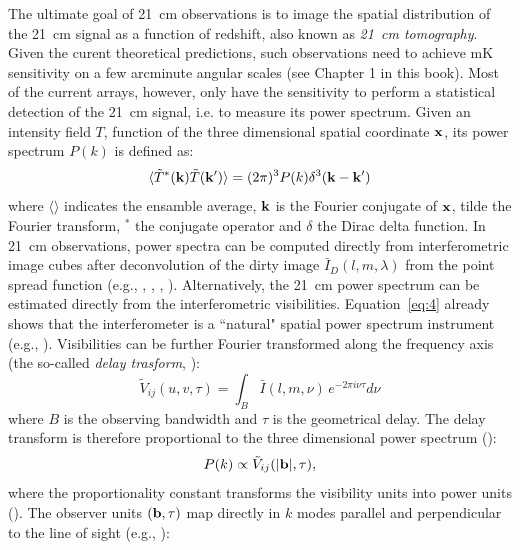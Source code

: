 The ultimate goal of 21~cm observations is to image the spatial distribution of the 21~cm signal as a function of redshift, also known as {\it 21~cm tomography}. Given the curent theoretical predictions, such observations need to achieve mK sensitivity on a few arcminute angular scales (see Chapter 1 in this book). Most of the current arrays, however, only have the sensitivity to perform a statistical detection of the 21~cm signal, i.e. to measure its power spectrum. Given an intensity field $T$, function of the three dimensional spatial coordinate $\bf x$, its power spectrum $P(k)$ is defined as:
\begin{equation}
\langle {\tilde T}^* ({\bf k}) {\tilde T}({\bf k'}) \rangle = (2 \pi)^3 P(k) \delta^3({\bf k} - {\bf k}')
\label{sec_observables_eq1}
\end{equation}
where $\langle \rangle$ indicates the ensamble average, $\bf k$ is the Fourier conjugate of $\bf x$, tilde the Fourier transform, $^*$ the conjugate operator and $\delta$ the Dirac delta function. In 21~cm observations, power spectra can be computed directly from interferometric image cubes after deconvolution of the dirty image ${\bar I}_D (l,m,\lambda)$ from the point spread function (e.g., \cite{pen09}, \cite{harker10}, \cite{beardsley16}, \cite{patil17}). Alternatively, the 21~cm power spectrum can be estimated directly from the interferometric visibilities. Equation~\ref{eq:4} already shows that the interferometer is a ``natural" spatial power spectrum instrument (e.g., \cite{white99}). Visibilities can be further Fourier transformed along the frequency axis (the so-called {\it delay trasform}, \cite{parsons12a}): 
\begin{equation}
{\tilde V}_{ij} (u,v, \tau) = \int_B {\bar I} (l, m, \nu) \, e^{-2 \pi i \nu \tau} d \nu
\label{sec_observables_eq2}
\end{equation}
where $B$ is the observing bandwidth and $\tau$ is the geometrical delay. The delay transform is therefore proportional to the three dimensional power spectrum (\cite{parsons12b}):
\begin{equation}
P(k) \propto {\tilde V}_{ij} (|{\bf b}|, \tau),
\label{sec_observables_eq3}
\end{equation}
where the proportionality constant transforms the visibility units into power units (\cite{parsons12b}). The observer units $({\bf b},\tau)$ map directly in $k$ modes parallel and perpendicular to the line of sight (e.g., \cite{morales04}):
